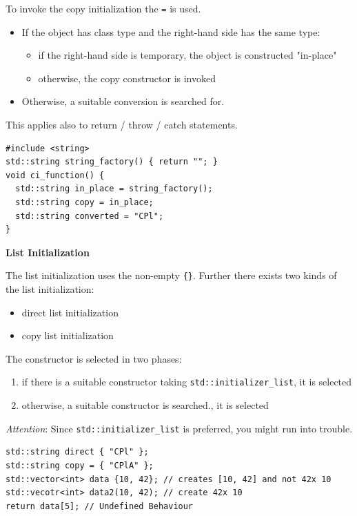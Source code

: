 \documentclass[11pt,twoside,landscape]{article}
\begin{document}
\begin{multicols}{3}
To invoke the copy initialization the \texttt{=} is used.

\begin{itemize}
\item If the object has class type and the right-hand side has the same type:
\begin{itemize}
\item if the right-hand side is temporary, the object is constructed "in-place"
\item otherwise, the copy constructor is invoked
\end{itemize}
\item Otherwise, a suitable conversion is searched for.
\end{itemize}

This applies also to return / throw / catch statements.

\lstset{language=c++,label= ,caption= ,captionpos=b,numbers=none}
\begin{lstlisting}
#include <string>
std::string string_factory() { return ""; }
void ci_function() {
  std::string in_place = string_factory();
  std::string copy = in_place;
  std::string converted = "CPl";
}
\end{lstlisting}

\textbf{List Initialization}

The list initialization uses the non-empty \texttt{\{\}}.
Further there exists two kinds of the list initialization:
\begin{itemize}
\item direct list initialization
\item copy list initialization
\end{itemize}


The constructor is selected in two phases:
\begin{enumerate}
\item if there is a suitable constructor taking \texttt{std::initializer\_list}, it is selected
\item otherwise, a suitable constructor is searched., it is selected
\end{enumerate}


\emph{Attention}: Since \texttt{std::initializer\_list} is preferred, you might run into trouble.


\lstset{language=c++,label= ,caption= ,captionpos=b,numbers=none}
\begin{lstlisting}
std::string direct { "CPl" };
std::string copy = { "CPlA" };
std::vector<int> data {10, 42}; // creates [10, 42] and not 42x 10
std::vecotr<int> data2(10, 42); // create 42x 10
return data[5]; // Undefined Behaviour
\end{lstlisting}


\end{multicols}
\end{document}
